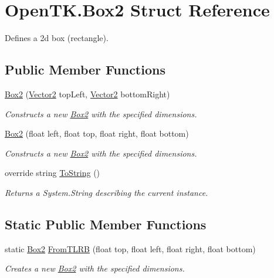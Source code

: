 \hypertarget{struct_open_t_k_1_1_box2}{\section{Open\-T\-K.\-Box2 Struct Reference}
\label{struct_open_t_k_1_1_box2}
}


Defines a 2d box (rectangle).  


\subsection*{Public Member Functions}
\begin{DoxyCompactItemize}
\item 
\hyperlink{struct_open_t_k_1_1_box2_aba639284289656d3c03942468db21edf}{Box2} (\hyperlink{struct_open_t_k_1_1_vector2}{Vector2} top\-Left, \hyperlink{struct_open_t_k_1_1_vector2}{Vector2} bottom\-Right)
\begin{DoxyCompactList}\small\item\em Constructs a new \hyperlink{struct_open_t_k_1_1_box2}{Box2} with the specified dimensions. \end{DoxyCompactList}\item 
\hyperlink{struct_open_t_k_1_1_box2_aa1ae0521844ef0da963bdb6ce747ea23}{Box2} (float left, float top, float right, float bottom)
\begin{DoxyCompactList}\small\item\em Constructs a new \hyperlink{struct_open_t_k_1_1_box2}{Box2} with the specified dimensions. \end{DoxyCompactList}\item 
override string \hyperlink{struct_open_t_k_1_1_box2_a5c2a2a197651d7b7ab41e97d624d11cd}{To\-String} ()
\begin{DoxyCompactList}\small\item\em Returns a System.\-String describing the current instance. \end{DoxyCompactList}\end{DoxyCompactItemize}
\subsection*{Static Public Member Functions}
\begin{DoxyCompactItemize}
\item 
static \hyperlink{struct_open_t_k_1_1_box2}{Box2} \hyperlink{struct_open_t_k_1_1_box2_af0fcbae75b8333641ac24493be1763c7}{From\-T\-L\-R\-B} (float top, float left, float right, float bottom)
\begin{DoxyCompactList}\small\item\em Creates a new \hyperlink{struct_open_t_k_1_1_box2}{Box2} with the specified dimensions. \end{DoxyCompactList}\end{DoxyCompactItemize}
